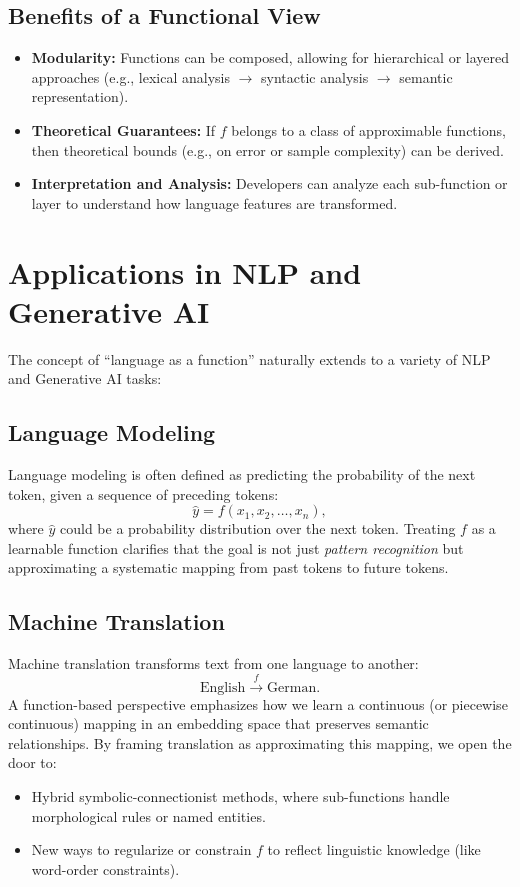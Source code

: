 \documentclass[11pt]{article}
\begin{document}
\subsection{Benefits of a Functional View}
\begin{itemize}
    \item \textbf{Modularity:} Functions can be composed, allowing for hierarchical or layered approaches (e.g., lexical analysis $\to$ syntactic analysis $\to$ semantic representation).
    \item \textbf{Theoretical Guarantees:} If $f$ belongs to a class of approximable functions, then theoretical bounds (e.g., on error or sample complexity) can be derived.
    \item \textbf{Interpretation and Analysis:} Developers can analyze each sub-function or layer to understand how language features are transformed.
\end{itemize}

\section{Applications in NLP and Generative AI}
\label{sec:applications}
The concept of ``language as a function'' naturally extends to a variety of NLP and Generative AI tasks:

\subsection{Language Modeling}
Language modeling is often defined as predicting the probability of the next token, given a sequence of preceding tokens:
\[
\hat{y} = f(x_1, x_2, \ldots, x_n),
\]
where $\hat{y}$ could be a probability distribution over the next token. Treating $f$ as a learnable function clarifies that the goal is not just \emph{pattern recognition} but approximating a systematic mapping from past tokens to future tokens.

\subsection{Machine Translation}
Machine translation transforms text from one language to another:
\[
\text{English} \xrightarrow{f} \text{German}.
\]
A function-based perspective emphasizes how we learn a continuous (or piecewise continuous) mapping in an embedding space that preserves semantic relationships. By framing translation as approximating this mapping, we open the door to:
\begin{itemize}
    \item Hybrid symbolic-connectionist methods, where sub-functions handle morphological rules or named entities.
    \item New ways to regularize or constrain $f$ to reflect linguistic knowledge (like word-order constraints).
\end{itemize}
\end{document}
